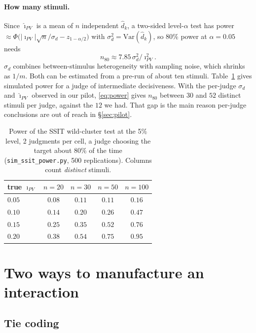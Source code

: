 \documentclass[10pt]{article}
\theoremstyle{remark}
\newcommand{\iPV}{\imath_{PV}}
\newcommand{\hiPV}{\hat\imath_{PV}}
\begin{document}
\paragraph{How many stimuli.}
Since $\hiPV$ is a mean of $n$ independent $\hat d_k$, a two-sided
level-$\alpha$ test has power
$\approx\Phi\bigl(|\iPV|\sqrt n/\sigma_d-z_{1-\alpha/2}\bigr)$ with
$\sigma_d^2=\mathrm{Var}(\hat d_k)$, so 80\% power at $\alpha=0.05$
needs
\begin{equation}
  n_{80}\approx 7.85\,\sigma_d^2/\iPV^2 .
  \label{eq:power}
\end{equation}
$\sigma_d$ combines between-stimulus heterogeneity with sampling noise,
which shrinks as $1/m$. Both can be estimated from a pre-run of about
ten stimuli. Table~\ref{tab:power} gives simulated power for a judge of
intermediate decisiveness. With the per-judge $\sigma_d$ and $\hiPV$
observed in our pilot, \eqref{eq:power} gives $n_{80}$ between $30$ and
$52$ distinct stimuli per judge, against the $12$ we had. That gap is
the main reason per-judge conclusions are out of reach in
\S\ref{sec:pilot}.

\begin{table}[t]
\centering
\caption{Power of the SSIT wild-cluster test at the 5\% level, 2
judgments per cell, a judge choosing the target about 80\% of the time
(\texttt{sim\_ssit\_power.py}, 500 replications). Columns count
\emph{distinct} stimuli.}
\label{tab:power}
\small
\begin{tabular}{lcccc}
\toprule
true $\iPV$ & $n=20$ & $n=30$ & $n=50$ & $n=100$\\
\midrule
$0.05$ & $0.08$ & $0.11$ & $0.11$ & $0.16$\\
$0.10$ & $0.14$ & $0.20$ & $0.26$ & $0.47$\\
$0.15$ & $0.25$ & $0.35$ & $0.52$ & $0.76$\\
$0.20$ & $0.38$ & $0.54$ & $0.75$ & $0.95$\\
\bottomrule
\end{tabular}
\end{table}

\section{Two ways to manufacture an interaction}
\label{sec:pitfalls}

\subsection{Tie coding}
\label{sec:ties}
\end{document}
